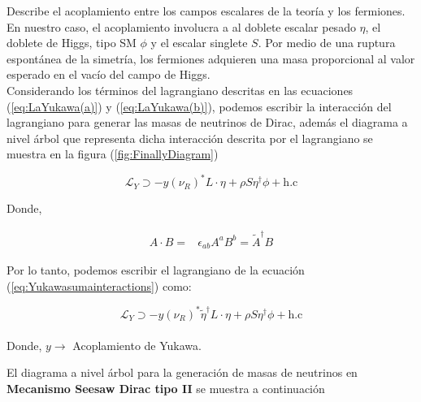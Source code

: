 \documentclass[12pt]{article}
\begin{document}
Describe el acoplamiento entre los campos escalares de la teoría y los fermiones. En nuestro caso, el acoplamiento involucra a al doblete escalar pesado $\eta$, el doblete de Higgs, tipo SM $\phi$ y el escalar singlete $S$. Por medio de una ruptura espontánea de la simetría, los fermiones adquieren una masa proporcional al valor esperado en el vacío del campo de Higgs. \\

Considerando los términos del lagrangiano descritas en las ecuaciones (\ref{eq:LaYukawa(a)}) y (\ref{eq:LaYukawa(b)}), podemos escribir la interacción del lagrangiano para generar las masas de neutrinos de Dirac, además el diagrama a nivel árbol que representa dicha interacción descrita por el lagrangiano se muestra en la figura (\ref{fig:FinallyDiagram})

\begin{equation}
    \label{eq:Yukawasumainteractions}
    \mathcal{L}_Y \supset  -y (\nu_R)^* {L}\cdot \eta + \rho S\eta^\dagger\phi + \text{h.c}
\end{equation}

Donde, 

\begin{align}
    \label{eq:cot}
    A\cdot B=&\epsilon_{ab}A^a B^b =\widetilde{A}^\dagger B
\end{align}

Por lo tanto, podemos escribir el lagrangiano de la ecuación  (\ref{eq:Yukawasumainteractions}) como:

\begin{equation}
    \label{eq:Weilalternativo}
    \mathcal{L}_Y \supset  -y (\nu_R)^* \widetilde{\eta}^\dagger {L}\cdot \eta + \rho S\eta^\dagger\phi + \text{h.c}
\end{equation} \\

Donde, $y \rightarrow $ Acoplamiento de Yukawa. 

El diagrama a nivel árbol para la generación de masas de neutrinos en \textbf{Mecanismo Seesaw Dirac tipo II} se muestra a continuación 
\end{document}

